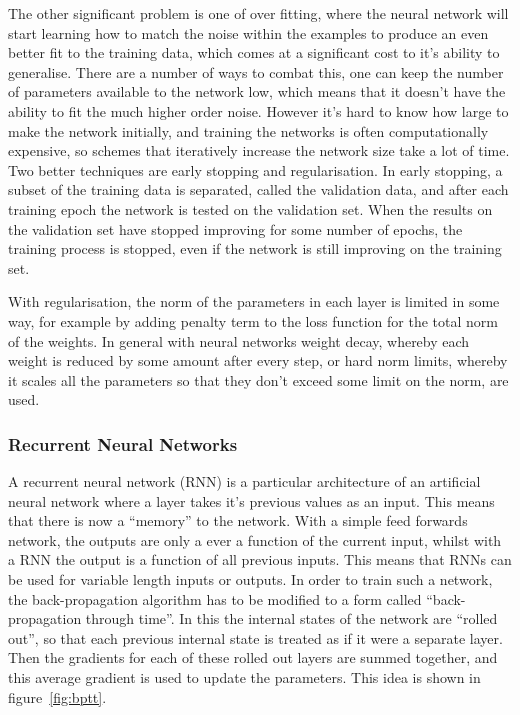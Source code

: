 The other significant problem is one of over fitting, where the neural network will start learning how to match the noise within the examples to produce an even better fit to the training data, which comes at a significant cost to it's ability to generalise. There are a number of ways to combat this, one can keep the number of parameters available to the network low, which means that it doesn't have the ability to fit the much higher order noise. However it's hard to know how large to make the network initially, and training the networks is often computationally expensive, so schemes that iteratively increase the network size take a lot of time. Two better techniques are early stopping and regularisation. In early stopping, a subset of the training data is separated, called the validation data, and after each training epoch the network is tested on the validation set. When the results on the validation set have stopped improving for some number of epochs, the training process is stopped, even if the network is still improving on the training set.

With regularisation, the norm of the parameters in each layer is limited in some way, for example by adding penalty term to the loss function for the total norm of the weights. In general with neural networks weight decay, whereby each weight is reduced by some amount after every step, or hard norm limits, whereby it scales all the parameters so that they don't exceed some limit on the norm, are used.
\subsubsection{Recurrent Neural Networks}

A recurrent neural network (RNN) is a particular architecture of an artificial neural network where a layer takes it's previous values as an input. This means that there is now a ``memory'' to the network. With a simple feed forwards network, the outputs are only a ever a function of the current input, whilst with a RNN the output is a function of all previous inputs. This means that RNNs can be used for variable length inputs or outputs. In order to train such a network, the back-propagation algorithm has to be modified to a form called ``back-propagation through time''. In this the internal states of the network are ``rolled out'', so that each previous internal state is treated as if it were a separate layer. Then the gradients for each of these rolled out layers are summed together, and this average gradient is used to update the parameters. This idea is shown in figure~\ref{fig:bptt}.

